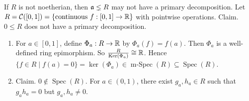\begin{example}\label{4.32}
    If $R$ is not noetherian, then $\mathfrak{a} \lneq R$ may not have a primary decomposition. Let $R = \mathcal{C}([0,1]) = \{\text{continuous }f: [0,1] \to \mathbb{R}\}$ with pointwise operations. Claim. $0 \leq R$ does not have a primary decomposition.
    \begin{enumerate}
        \item For $a \in [0,1]$, define $\Phi_a: R \to \mathbb{R}$ by $\Phi_a(f) = f(a)$. Then $\Phi_a$ is a well-defined ring epimorphism. So $\frac{R}{\operatorname{Ker}(\Phi_a)} \cong \mathbb{R}$. Hence $\{f \in R \mid f(a) = 0\} = \ker(\Phi_a) \in \operatorname{m-Spec}(R) \subseteq \operatorname{Spec}(R)$.
        \item Claim. $0 \not \in \operatorname{Spec}(R)$. For $a \in (0,1)$, there exist $g_a,h_a \in R$ such that $g_ah_a = 0$ but $g_a,h_a \neq 0$.
            

\end{enumerate}
\end{example}
